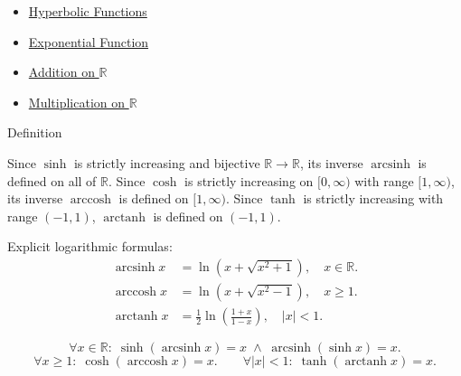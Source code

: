 \begin{dependencies}
\begin{itemize}
  \item \hyperref[def:hyperbolic]{Hyperbolic Functions}
  \item \hyperref[def:exponential]{Exponential Function}
  \item \hyperref[def:addition-on-r]{Addition on $\mathbb{R}$}
  \item \hyperref[def:multiplication-on-r]{Multiplication on $\mathbb{R}$}
\end{itemize}
\end{dependencies}


\begin{definitionbox}{Definition}
\begin{definition}
\label{def:inverse-hyperbolic}
Since $\sinh$ is strictly increasing and bijective $\mathbb{R} \to
\mathbb{R}$, its inverse $\operatorname{arcsinh}$ is defined on all
of $\mathbb{R}$. Since $\cosh$ is strictly increasing on
$[0,\infty)$ with range $[1,\infty)$, its inverse
$\operatorname{arccosh}$ is defined on $[1,\infty)$. Since $\tanh$
is strictly increasing with range $(-1,1)$, $\operatorname{arctanh}$
is defined on $(-1,1)$.

Explicit logarithmic formulas:
\begin{align*}
  \operatorname{arcsinh} x
  &= \ln\!\left(x + \sqrt{x^2+1}\right),
  \quad x \in \mathbb{R}. \\
  \operatorname{arccosh} x
  &= \ln\!\left(x + \sqrt{x^2-1}\right),
  \quad x \geq 1. \\
  \operatorname{arctanh} x
  &= \tfrac{1}{2}\ln\!\left(\frac{1+x}{1-x}\right),
  \quad |x| < 1.
\end{align*}
\end{definition}
\end{definitionbox}

\begin{remark*}
\[
  \forall x\in\mathbb{R}:\;
  \sinh(\operatorname{arcsinh} x)=x
  \;\wedge\;
  \operatorname{arcsinh}(\sinh x)=x.
\]
\[
  \forall x\geq 1:\;
  \cosh(\operatorname{arccosh} x)=x.
  \qquad
  \forall |x|<1:\;
  \tanh(\operatorname{arctanh} x)=x.
\]
\end{remark*}

